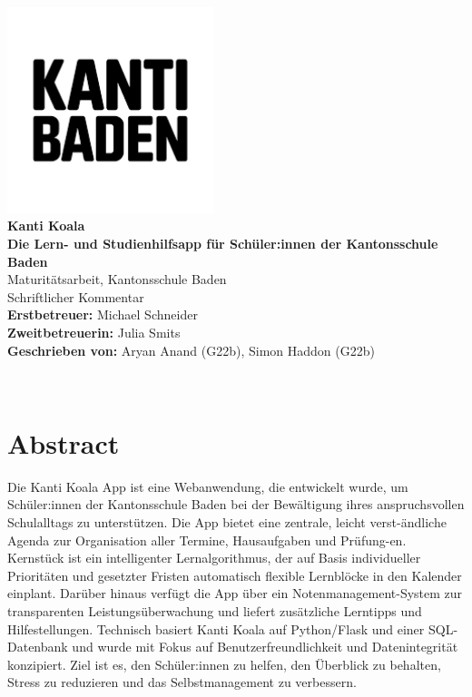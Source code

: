 \documentclass[12pt,a4paper]{report}
\begin{document}
\onehalfspacing

\makeatletter
\begin{titlepage}
    \centering
    \vspace*{1cm}
       { \includegraphics[width=6cm]{img/kanti-baden.png}}\\[1cm]

    {\LARGE \textbf{Kanti Koala}}\\
    {\textbf{Die Lern- und Studienhilfsapp für Schüler:innen der Kantonsschule Baden}}\\[1cm]

    {Maturitätsarbeit, Kantonsschule Baden}\\
    {Schriftlicher Kommentar}\\[1cm]
    
    \textbf{Erstbetreuer: }{Michael Schneider}\\
    \textbf{Zweitbetreuerin: }{Julia Smits}\\[1cm]
    
    \textbf{Geschrieben von: }{Aryan Anand (G22b), Simon Haddon (G22b)}\\[1cm]
    \date{\large Datum: 11. November 2025}
    {\@date\\}
\end{titlepage}
\makeatother

\chapter*{Abstract}
Die Kanti Koala App ist eine Webanwendung, die entwickelt wurde, um Schüler:innen der Kantonsschule Baden bei der Bewältigung ihres anspruchsvollen Schulalltags zu unterstützen. 
Die App bietet eine zentrale, leicht verst-ändliche Agenda zur Organisation aller Termine, Hausaufgaben und Prüfung-en. 
Kernstück ist ein intelligenter Lernalgorithmus, der auf Basis individueller Prioritäten und gesetzter Fristen automatisch flexible Lernblöcke in den Kalender einplant. 
Darüber hinaus verfügt die App über ein Notenmanagement-System zur transparenten Leistungsüberwachung und liefert zusätzliche Lerntipps und Hilfestellungen. Technisch basiert Kanti Koala auf Python/Flask und einer SQL-Datenbank und wurde mit Fokus auf Benutzerfreundlichkeit und Datenintegrität konzipiert. Ziel ist es, den Schüler:innen zu helfen, den Überblick zu behalten, Stress zu reduzieren und das Selbstmanagement zu verbessern.
\pagebreak
\end{document}

